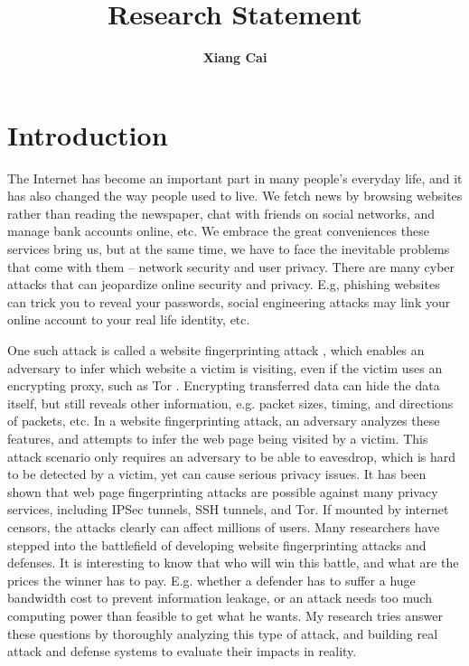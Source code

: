 \documentclass[11pt,oneside]{article}
\begin{document}
\title{\textbf{Research Statement}}
\author{\textbf{Xiang Cai}}
\date{}

\maketitle

\section{Introduction}

The Internet has become an important part in many people's everyday life, and it has also changed the way people used to live. We fetch news by browsing websites rather than reading the newspaper, chat with friends on social networks, and manage bank accounts online, etc. We embrace the great conveniences these services bring us, but at the same time, we have to face the inevitable problems that come with them -- network security and user privacy. There are many cyber attacks that can jeopardize online security and privacy. E.g, phishing websites can trick you to reveal your passwords, social engineering attacks may link your online account to your real life identity, etc.

One such attack is called a website fingerprinting attack \cite{hintz-pets02}, which enables an adversary to infer which website a victim is visiting, even if the victim uses an encrypting proxy, such as Tor \cite{tor-website}. Encrypting transferred data can hide the data itself, but still reveals other information, e.g. packet sizes, timing, and directions of packets, etc. In a website fingerprinting attack, an adversary analyzes these features, and attempts to infer the web page being visited by a victim. This attack scenario only requires an adversary to be able to eavesdrop, which is hard to be detected by a victim, yet can cause serious privacy issues. It has been shown that web page fingerprinting attacks are possible against many privacy services, including IPSec tunnels, SSH tunnels, and Tor. If mounted by internet censors, the attacks clearly can affect millions of users. Many researchers have stepped into the battlefield of developing website fingerprinting attacks and defenses. It is interesting to know that who will win this battle, and what are the prices the winner has to pay. E.g. whether a defender has to suffer a huge bandwidth cost to prevent information leakage, or an attack needs too much computing power than feasible to get what he wants. My research tries answer these questions by thoroughly analyzing this type of attack, and building real attack and defense systems to evaluate their impacts in reality.
\end{document}
